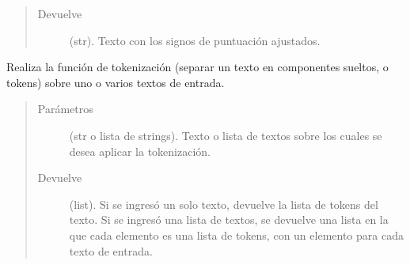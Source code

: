 \documentclass[letterpaper,10pt,openany,spanish]{sphinxmanual}
\begin{document}
\begin{fulllineitems}
\begin{fulllineitems}
\begin{quote}
\begin{description}
\item[{Devuelve}] \leavevmode
(str). Texto con los signos de puntuación ajustados.

\end{description}\end{quote}

\end{fulllineitems}


\begin{fulllineitems}
\label{\detokenize{funciones/utils:utils.tokenizacion.TokenizadorNLTK.tokenizar}}
Realiza la función de tokenización (separar un texto en componentes sueltos, o tokens) sobre             uno o varios textos de entrada.
\begin{quote}\begin{description}
\item[{Parámetros}] \leavevmode
{} \textendash{} (str o lista de strings). Texto o lista de textos sobre los cuales se desea             aplicar la tokenización.

\item[{Devuelve}] \leavevmode
(list). Si se ingresó un solo texto, devuelve la lista de tokens del texto. Si se             ingresó una lista de textos, se devuelve una lista en la que cada elemento es una lista de             tokens, con un elemento para cada texto de entrada.

\end{description}\end{quote}

\end{fulllineitems}


\end{fulllineitems}

\end{document}
